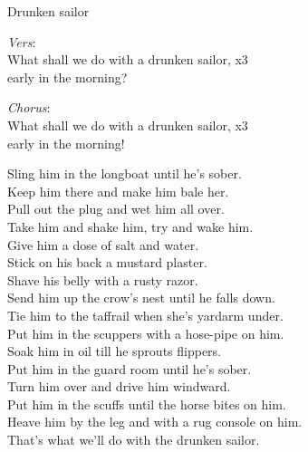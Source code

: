 \begin{song}{Drunken sailor}	
	
	
	\emph{Vers}:\\
	\showversenumber \repetitionbegin{} What shall we do with a drunken sailor, \repetitionend{} x3 \\
	early in the morning?

	\emph{Chorus}:\\
	\repetitionbegin{} What shall we do with a drunken sailor, \repetitionend{} x3 \\
	early in the morning!

	\showversenumber Sling him in the longboat until he’s sober.\\
	\showversenumber Keep him there and make him bale her.\\
	\showversenumber Pull out the plug and wet him all over.\\
	\showversenumber Take him and shake him, try and wake him.\\
	\showversenumber Give him a dose of salt and water.\\
	\showversenumber Stick on his back a mustard plaster.\\
	\showversenumber Shave his belly with a rusty razor.\\
	\showversenumber Send him up the crow’s nest until he falls down.\\
	\showversenumber Tie him to the taffrail when she’s yardarm under.\\
	\showversenumber Put him in the scuppers with a hose-pipe on him.\\
	\showversenumber Soak him in oil till he sprouts flippers.\\
	\showversenumber Put him in the guard room until he’s sober.\\
	\showversenumber Turn him over and drive him windward.\\
	\showversenumber Put him in the scuffs until the horse bites on him.\\
	\showversenumber Heave him by the leg and with a rug console on him.\\
	\showversenumber That’s what we’ll do with the drunken sailor.
	
\end{song}
